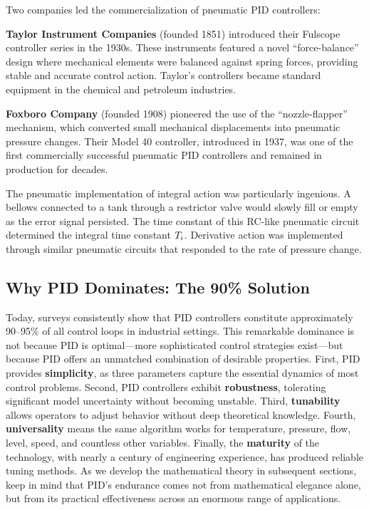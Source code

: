 Two companies led the commercialization of pneumatic PID controllers:

\textbf{Taylor Instrument Companies} (founded 1851) introduced their Fulscope controller series in the 1930s. These instruments featured a novel ``force-balance'' design where mechanical elements were balanced against spring forces, providing stable and accurate control action. Taylor's controllers became standard equipment in the chemical and petroleum industries.

\textbf{Foxboro Company} (founded 1908) pioneered the use of the ``nozzle-flapper'' mechanism, which converted small mechanical displacements into pneumatic pressure changes. Their Model 40 controller, introduced in 1937, was one of the first commercially successful pneumatic PID controllers and remained in production for decades.

The pneumatic implementation of integral action was particularly ingenious. A bellows connected to a tank through a restrictor valve would slowly fill or empty as the error signal persisted. The time constant of this RC-like pneumatic circuit determined the integral time constant $T_i$. Derivative action was implemented through similar pneumatic circuits that responded to the rate of pressure change.

\subsection{Why PID Dominates: The 90\% Solution}

Today, surveys consistently show that PID controllers constitute approximately 90--95\% of all control loops in industrial settings. This remarkable dominance is not because PID is optimal---more sophisticated control strategies exist---but because PID offers an unmatched combination of desirable properties. First, PID provides \textbf{simplicity}, as three parameters capture the essential dynamics of most control problems. Second, PID controllers exhibit \textbf{robustness}, tolerating significant model uncertainty without becoming unstable. Third, \textbf{tunability} allows operators to adjust behavior without deep theoretical knowledge. Fourth, \textbf{universality} means the same algorithm works for temperature, pressure, flow, level, speed, and countless other variables. Finally, the \textbf{maturity} of the technology, with nearly a century of engineering experience, has produced reliable tuning methods. As we develop the mathematical theory in subsequent sections, keep in mind that PID's endurance comes not from mathematical elegance alone, but from its practical effectiveness across an enormous range of applications.


